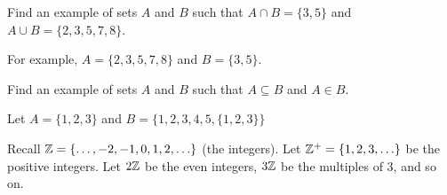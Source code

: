 \begin{questions}
\begin{answer}
  \end{answer}



\question Find an example of sets $A$ and $B$ such that $A\cap B = \{3, 5\}$ and $A \cup B = \{2, 3, 5, 7, 8\}$.

  \begin{answer}
    For example, $A = \{2,3,5,7,8\}$ and $B = \{3,5\}$.
  \end{answer}



\question Find an example of sets $A$ and $B$ such that $A \subseteq B$ and $A \in B$.

  \begin{answer}
    Let $A = \{1,2,3\}$ and $B = \{1,2,3,4,5,\{1,2,3\}\}$
  \end{answer}



\question Recall $\mathbb Z = \{\ldots,-2,-1,0, 1,2,\ldots\}$ (the integers).  Let $\mathbb Z^+ = \{1, 2, 3, \ldots\}$ be the positive integers.  Let $2\mathbb Z$ be the even integers, $3\mathbb Z$ be the multiples of 3, and so on.


\end{questions}
